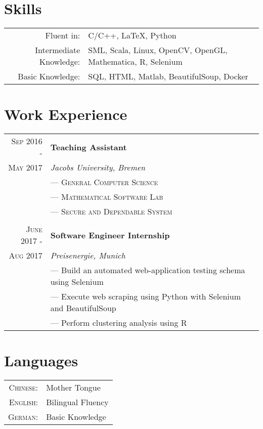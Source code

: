 \documentclass[a4paper,10pt]{article}
\begin{document}
	
	\section{Skills}
	\begin{tabular}{rl}
		Fluent in: & C/C++, LaTeX, Python\\
		Intermediate Knowledge:& SML, Scala, Linux, OpenCV, OpenGL, Mathematica, R, Selenium\\
		Basic Knowledge:& SQL, HTML, Matlab, BeautifulSoup, Docker\\
	\end{tabular}
	
	
	
	\section{Work Experience}
	\begin{tabular}{r|l}
		\textsc{Sep 2016 - } & \textbf{Teaching Assistant} \\\textsc{May 2017}&\emph{Jacobs University, Bremen}
		\\& --- \textsc{General Computer Science}
		\\& --- \textsc{Mathematical Software Lab} 
		\\& --- \textsc{Secure and Dependable System}
		\\ \multicolumn{2}{c}{} \\
		\textsc{June 2017 - } & \textbf{Software Engineer Internship} \\\textsc{Aug 2017}&\emph{Preisenergie, Munich}
		\\& --- Build an automated web-application testing schema using Selenium
		\\& --- Execute web scraping using Python with Selenium and BeautifulSoup
		\\& --- Perform clustering analysis using R
	\end{tabular}
	
	\section{Languages}
	\begin{tabular}{rl}
		\textsc{Chinese:}& Mother Tongue\\
		\textsc{English:}& Bilingual Fluency\\
		\textsc{German:}& Basic Knowledge\\
	\end{tabular}
	
\end{document}
